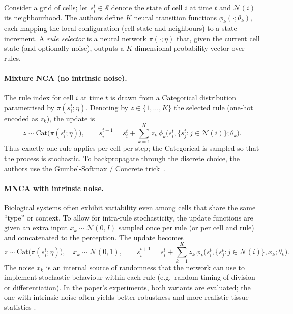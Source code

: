 Consider a grid of cells; let \(s^t_i \in \mathcal{S}\) denote the state of cell \(i\) at time \(t\) and \(\mathcal{N}(i)\) its neighbourhood. The authors define \(K\) neural transition functions \(\phi_k(\cdot; \theta_k)\), each mapping the local configuration (cell state and neighbours) to a state increment. A \emph{rule selector} is a neural network \(\pi(\cdot; \eta)\) that, given the current cell state (and optionally noise), outputs a \(K\)-dimensional probability vector over rules.

\paragraph{Mixture NCA (no intrinsic noise).} The rule index for cell \(i\) at time \(t\) is drawn from a Categorical distribution parametrised by \(\pi(s^t_i; \eta)\). Denoting by \(z \in \{1,\ldots,K\}\) the selected rule (one-hot encoded as \(z_k\)), the update is
\begin{equation}
z \sim \mathrm{Cat}\bigl(\pi(s^t_i; \eta)\bigr), \qquad
s^{t+1}_i = s^t_i + \sum_{k=1}^{K} z_k \, \phi_k\bigl(s^t_i, \{s^t_j : j \in \mathcal{N}(i)\}; \theta_k\bigr).
\end{equation}
Thus exactly one rule applies per cell per step; the Categorical is sampled so that the process is stochastic. To backpropagate through the discrete choice, the authors use the Gumbel-Softmax / Concrete trick~\cite{jang2017gumbel,maddison2017concrete,mnca_milite2025}.

\paragraph{MNCA with intrinsic noise.} Biological systems often exhibit variability even among cells that share the same ``type'' or context. To allow for intra-rule stochasticity, the update functions are given an extra input \(x_k \sim \mathcal{N}(0, I)\) sampled once per rule (or per cell and rule) and concatenated to the perception. The update becomes
\begin{equation}
z \sim \mathrm{Cat}\bigl(\pi(s^t_i; \eta)\bigr), \quad
x_k \sim \mathcal{N}(0, 1), \qquad
s^{t+1}_i = s^t_i + \sum_{k=1}^{K} z_k \, \phi_k\bigl(s^t_i, \{s^t_j : j \in \mathcal{N}(i)\}, x_k; \theta_k\bigr).
\end{equation}
The noise \(x_k\) is an internal source of randomness that the network can use to implement stochastic behaviour within each rule (e.g.\ random timing of division or differentiation). In the paper's experiments, both variants are evaluated; the one with intrinsic noise often yields better robustness and more realistic tissue statistics \cite{mnca_milite2025}.


